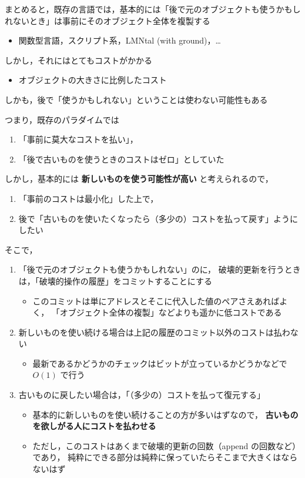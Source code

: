 \documentclass[10pt, a4j, twocolumn]{scrartcl}
\begin{document}
まとめると，既存の言語では，基本的には「後で元のオブジェクトも使うかもしれないとき」は事前にそのオブジェクト全体を複製する
\begin{itemize}
\item 関数型言語，スクリプト系，LMNtal (with ground)，\ldots{}
\end{itemize}


しかし，それにはとてもコストがかかる
\begin{itemize}
\item オブジェクトの大きさに比例したコスト
\end{itemize}


しかも，後で「使うかもしれない」ということは使わない可能性もある

つまり，既存のパラダイムでは
\begin{enumerate}
\item 「事前に莫大なコストを払い」，
\item 「後で古いものを使うときのコストはゼロ」としていた
\end{enumerate}

しかし，基本的には \textbf{\textbf{新しいものを使う可能性が高い}} と考えられるので，
\begin{enumerate}
\item 「事前のコストは最小化」した上で，
\item 後で「古いものを使いたくなったら（多少の）コストを払って戻す」ようにしたい
\end{enumerate}


そこで，
\begin{enumerate}
\item 「後で元のオブジェクトも使うかもしれない」のに，
破壊的更新を行うときは，「破壊的操作の履歴」をコミットすることにする
\begin{itemize}
\item このコミットは単にアドレスとそこに代入した値のペアさえあればよく，
「オブジェクト全体の複製」などよりも遥かに低コストである
\end{itemize}
\item 新しいものを使い続ける場合は上記の履歴のコミット以外のコストは払わない
\begin{itemize}
\item 最新であるかどうかのチェックはビットが立っているかどうかなどで \(O(1)\) で行う
\end{itemize}
\item 古いものに戻したい場合は，「（多少の）コストを払って復元する」
\begin{itemize}
\item 基本的に新しいものを使い続けることの方が多いはずなので，
\textbf{\textbf{古いものを欲しがる人にコストを払わせる}}
\item ただし，このコストはあくまで破壊的更新の回数（append の回数など）であり，
純粋にできる部分は純粋に保っていたらそこまで大きくはならないはず
\end{itemize}
\end{enumerate}
\end{document}

